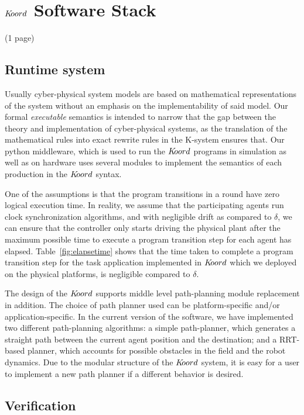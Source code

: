 \section{$K\kern-2pt oord$ Software Stack}
\label{sec:verif}
(1 page)



\subsection{Runtime system}
Usually cyber-physical system models are based on mathematical representations of the system without an emphasis on the implementability of said model. Our formal \emph{executable} semantics is intended to narrow that the gap between the theory and implementation of cyber-physical systems, as the translation of the mathematical rules into exact rewrite rules in the K-system ensures that. Our python middleware, which is used to run the $K\kern-2pt oord$ programs in simulation as well as on hardware uses several modules to implement the semantics of each production in the $K\kern-2pt oord$ syntax. 

One of the assumptions is that the program transitions in a round have  zero logical execution time. In reality, we assume that the participating agents run clock synchronization algorithms, and with negligible drift as compared to $\delta$, we can ensure that the controller only starts driving the physical plant after the maximum possible time to execute a program transition step for each agent has elapsed. Table~\ref{fig:elapsetime} shows that the time taken to complete a program transition step for the task application implemented in $K\kern-2pt oord$ which we deployed on the physical platforms, is negligible compared to $\delta$.

The design of the $K\kern-2pt oord $ supports middle level path-planning module  replacement  in  addition.  The  choice  of  path planner  used  can  be  platform-specific  and/or  application-specific. In the current version of the software, we have implemented  two  different  path-planning  algorithms:  a  simple path-planner,  which  generates  a  straight  path  between  the current agent position and the destination; and a RRT-based planner,  which  accounts  for  possible  obstacles  in  the  field and the robot dynamics. Due to the modular structure of the $K\kern-2pt oord$ system, it is easy for a user to implement a new path planner if a different behavior is desired.

\subsection{Verification}

